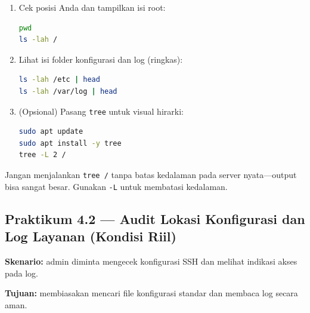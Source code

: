\begin{enumerate}
    \item Cek posisi Anda dan tampilkan isi root:
\begin{lstlisting}[language=bash, caption={Melihat root filesystem dan isinya}]
pwd
ls -lah /
\end{lstlisting}

    \item Lihat isi folder konfigurasi dan log (ringkas):
\begin{lstlisting}[language=bash, caption={Menginspeksi /etc dan /var/log}]
ls -lah /etc | head
ls -lah /var/log | head
\end{lstlisting}

    \item (Opsional) Pasang \texttt{tree} untuk visual hirarki:
\begin{lstlisting}[language=bash, caption={Memasang tree dan menampilkan struktur folder}]
sudo apt update
sudo apt install -y tree
tree -L 2 /
\end{lstlisting}
\end{enumerate}

\begin{warningbox}
Jangan menjalankan \texttt{tree /} tanpa batas kedalaman pada server nyata—output bisa sangat besar.
Gunakan \texttt{-L} untuk membatasi kedalaman.
\end{warningbox}

\subsection*{Praktikum 4.2 --- Audit Lokasi Konfigurasi dan Log Layanan (Kondisi Riil)}
\textbf{Skenario:} admin diminta mengecek konfigurasi SSH dan melihat indikasi akses pada log.

\textbf{Tujuan:} membiasakan mencari file konfigurasi standar dan membaca log secara aman.

